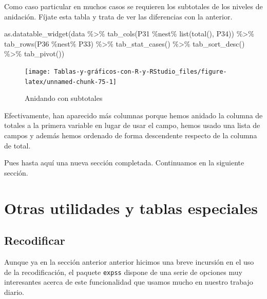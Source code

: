 \documentclass[
]{book}
\newenvironment{Shaded}{\begin{snugshade}}{\end{snugshade}}
\newcommand{\FunctionTok}[1]{\textcolor[rgb]{0.00,0.00,0.00}{#1}}
\newcommand{\NormalTok}[1]{#1}
\newcommand{\SpecialCharTok}[1]{\textcolor[rgb]{0.00,0.00,0.00}{#1}}
\begin{document}
Como caso particular en muchos casos se requieren los subtotales de los niveles de anidación. Fíjate esta tabla y trata de ver las diferencias con la anterior.

\begin{Shaded}
\begin{Highlighting}[]
\FunctionTok{as.datatable\_widget}\NormalTok{(data }\SpecialCharTok{\%\textgreater{}\%} \FunctionTok{tab\_cols}\NormalTok{(P31 }\SpecialCharTok{\%nest\%} \FunctionTok{list}\NormalTok{(}\FunctionTok{total}\NormalTok{(), }
\NormalTok{  P34)) }\SpecialCharTok{\%\textgreater{}\%} \FunctionTok{tab\_rows}\NormalTok{(P36 }\SpecialCharTok{\%nest\%}\NormalTok{ P33) }\SpecialCharTok{\%\textgreater{}\%} \FunctionTok{tab\_stat\_cases}\NormalTok{() }\SpecialCharTok{\%\textgreater{}\%} 
  \FunctionTok{tab\_sort\_desc}\NormalTok{() }\SpecialCharTok{\%\textgreater{}\%} \FunctionTok{tab\_pivot}\NormalTok{())}
\end{Highlighting}
\end{Shaded}

\begin{figure}[H]

{\centering \texttt{[image: Tablas-y-gráficos-con-R-y-RStudio\_files/figure-latex/unnamed-chunk-75-1]} 

}

\caption{Anidando con subtotales}\label{fig:unnamed-chunk-75}
\end{figure}

Efectivamente, han aparecido más columnas porque hemos anidado la columna de totales a la primera variable en lugar de usar el campo, hemos usado una lista de campos y además hemos ordenado de forma descendente respecto de la columna de total.

Pues hasta aquí una nueva sección completada. Continuamos en la siguiente sección.

\hypertarget{tse06}{%
\chapter{Otras utilidades y tablas especiales}\label{tse06}}

\hypertarget{recode}{%
\section{Recodificar}\label{recode}}

Aunque ya en la sección anterior anterior hicimos una breve incursión en el uso de la recodificación, el paquete \texttt{expss} dispone de una serie de opciones muy interesantes acerca de este funcionalidad que usamos mucho en nuestro trabajo diario.
\end{document}
